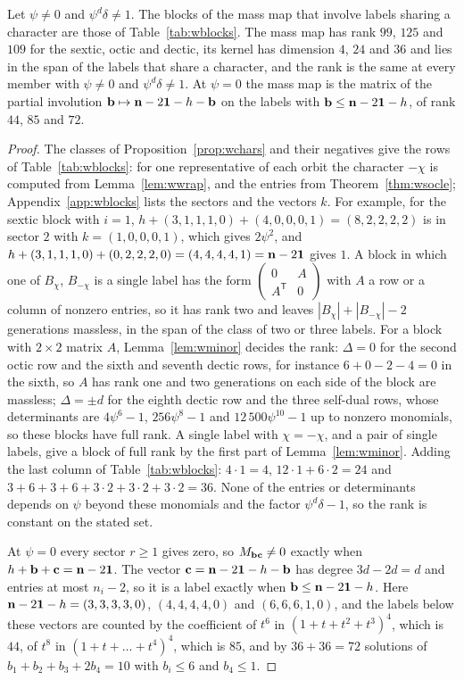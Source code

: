 \begin{proposition}\label{prop:wmass}
Let $\psi\ne0$ and $\psi^d\delta\ne1$. The blocks of the mass map that
involve labels sharing a character are those of Table~\ref{tab:wblocks}.
The mass map has rank $99$, $125$ and $109$ for the sextic, octic and
dectic, its kernel has dimension $4$, $24$ and $36$ and lies in the span of
the labels that share a character, and the rank is the same at every member
with $\psi\ne0$ and $\psi^d\delta\ne1$. At $\psi=0$ the mass map is the
matrix of the partial involution $\mathbf{b}\mapsto\mathbf n-2\mathbf{1}-h-\mathbf{b}$ on the
labels with $\mathbf{b}\le\mathbf n-2\mathbf{1}-h$, of rank $44$, $85$ and $72$.
\end{proposition}

\begin{proof}
The classes of Proposition~\ref{prop:wchars} and their negatives give the
rows of Table~\ref{tab:wblocks}: for one representative of each orbit the
character $-\chi$ is computed from Lemma~\ref{lem:wwrap}, and the entries
from Theorem~\ref{thm:wsocle}; Appendix~\ref{app:wblocks} lists the sectors
and the vectors $k$. For example, for the sextic block with $i=1$,
$h+(3,1,1,1,0)+(4,0,0,0,1)=(8,2,2,2,2)$ is in sector $2$ with
$k=(1,0,0,0,1)$, which gives $2\psi^2$, and $h+(3,1,1,1,0)+(0,2,2,2,0)=
(4,4,4,4,1)=\mathbf n-2\mathbf{1}$ gives $1$. A block in which one of $B_\chi$,
$B_{-\chi}$ is a single label has the form $\left(\begin{smallmatrix}0&A\\
A^{\mathsf T}&0\end{smallmatrix}\right)$ with $A$ a row or a column of
nonzero entries, so it has rank two and leaves $|B_\chi|+|B_{-\chi}|-2$
generations massless, in the span of the class of two or three labels. For
a block with $2\times2$ matrix $A$, Lemma~\ref{lem:wminor} decides the
rank: $\Delta=0$ for the second octic row and the sixth and seventh dectic
rows, for instance $6+0-2-4=0$ in the sixth, so $A$ has rank one and two
generations on each side of the block are massless; $\Delta=\pm d$ for the
eighth dectic row and the three self-dual rows, whose determinants are
$4\psi^6-1$, $256\psi^8-1$ and $12\,500\psi^{10}-1$ up to nonzero
monomials, so these blocks have full rank. A single label with
$\chi=-\chi$, and a pair of single labels, give a block of full rank by the
first part of Lemma~\ref{lem:wminor}. Adding the last column of
Table~\ref{tab:wblocks}: $4\cdot1=4$, $12\cdot1+6\cdot2=24$ and
$3+6+3+6+3\cdot2+3\cdot2+3\cdot2=36$. None of the entries or
determinants depends on $\psi$ beyond these monomials and the factor
$\psi^d\delta-1$, so the rank is constant on the stated set.

At $\psi=0$ every sector $r\ge1$ gives zero, so $M_{\mathbf{b}\mathbf{c}}\ne0$ exactly
when $h+\mathbf{b}+\mathbf{c}=\mathbf n-2\mathbf{1}$. The vector
$\mathbf{c}=\mathbf n-2\mathbf{1}-h-\mathbf{b}$ has degree $3d-2d=d$ and entries at most
$n_i-2$, so it is a label exactly when $\mathbf{b}\le\mathbf n-2\mathbf{1}-h$. Here
$\mathbf n-2\mathbf{1}-h=(3,3,3,3,0)$, $(4,4,4,4,0)$ and $(6,6,6,1,0)$, and the
labels below these vectors are counted by the coefficient of $t^6$ in
$(1+t+t^2+t^3)^4$, which is $44$, of $t^8$ in $(1+t+\dots+t^4)^4$, which is
$85$, and by $36+36=72$ solutions of $b_1+b_2+b_3+2b_4=10$ with $b_i\le6$
and $b_4\le1$.
\end{proof}

